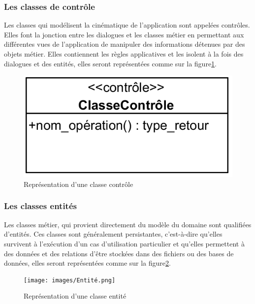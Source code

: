 \begin{itemize}
        \subsubsection{Les classes de contrôle}
        Les classes qui modélisent la cinématique de l’application sont appelées contrôles. Elles font la jonction entre les dialogues et les classes métier en permettant aux différentes vues de l’application de manipuler des informations détenues par des objets métier. Elles contiennent les règles applicatives et les isolent à la fois des dialogues et des entités, elles seront représentées comme sur la figure\ref{fig21}.
            \begin{figure}[h!]
                 \centering
                \includegraphics[scale=1.5]{images/Controle.png}
                 \caption{Représentation d'une classe contrôle}
                 \label{fig21}
            \end{figure}
        
        \subsubsection{Les classes entités}
        Les classes métier, qui provient directement du modèle du domaine sont qualifiées d’entités. Ces classes sont généralement persistantes, c’est-à-dire qu’elles survivent à l’exécution d’un cas d’utilisation particulier et qu’elles permettent à des données et des relations d’être stockées dans des fichiers ou des bases de données, elles seront représentées comme sur la figure\ref{fig22}.
        \clearpage
            \begin{figure}[h!]
                 \centering
                \texttt{[image: images/Entité.png]}
                 \caption{Représentation d'une classe entité}
                 \label{fig22}
            \end{figure}
        

\end{itemize}
